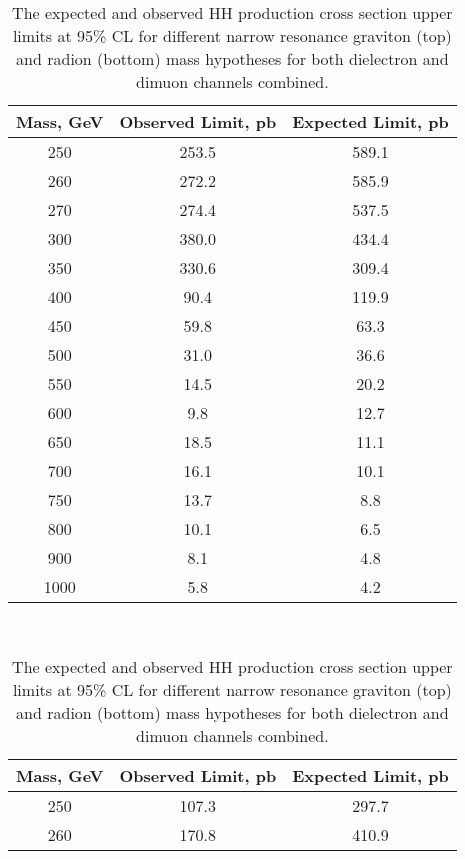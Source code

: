 \begin{small}
\begin{table}[H]
\begin{center}
\caption{The expected and observed HH production cross section upper limits at 95\% CL for different
narrow resonance graviton (top) and radion (bottom) mass hypotheses for both dielectron and dimuon channels combined.}
\label{tab:finalLimits}
\begin{tabular}{|c|c|c|}
\hline
Mass, GeV &  Observed Limit, pb &  Expected Limit, pb \\
\hline
      250 &               253.5 &               589.1 \\
      260 &               272.2 &               585.9 \\
      270 &               274.4 &               537.5 \\
      300 &               380.0 &               434.4 \\
      350 &               330.6 &               309.4 \\
      400 &                90.4 &               119.9 \\
      450 &                59.8 &                63.3 \\
      500 &                31.0 &                36.6 \\
      550 &                14.5 &                20.2 \\
      600 &                 9.8 &                12.7 \\
      650 &                18.5 &                11.1 \\
      700 &                16.1 &                10.1 \\
      750 &                13.7 &                 8.8 \\
      800 &                10.1 &                 6.5 \\
      900 &                 8.1 &                 4.8 \\
     1000 &                 5.8 &                 4.2 \\
\hline
\end{tabular}
\vspace{1 cm} \ \\
\begin{tabular}{|c|c|c|}
\hline
Mass, GeV &  Observed Limit, pb &  Expected Limit, pb \\
\hline
     250 &               107.3 &               297.7 \\
     260 &               170.8 &               410.9 \\

\end{tabular}
\end{center}
\end{table}
\end{small}
